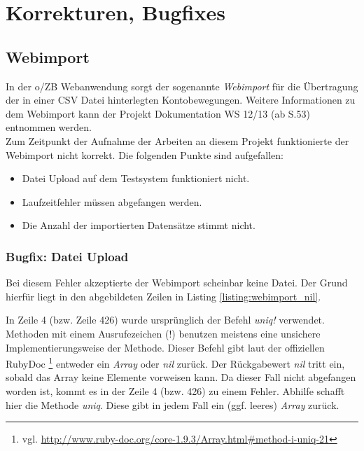 \documentclass[12pt,             %
               a4paper,          %
               listof=totoc,     %
               index=totoc,      %
               bibliography=totoc,%
               oneside,         %
               BCOR1cm,          %
               english   %
               ]{scrbook}
\begin{document}


\clearpage
\chapter{Korrekturen, Bugfixes}
\section{Webimport}
In der o/ZB Webanwendung sorgt der sogenannte \textit{Webimport} für die Übertragung der in einer CSV Datei hinterlegten Kontobewegungen. Weitere Informationen zu dem Webimport kann der Projekt Dokumentation WS 12/13 (ab S.53) entnommen werden.\\

Zum Zeitpunkt der Aufnahme der Arbeiten an diesem Projekt funktionierte der Webimport nicht korrekt. Die folgenden Punkte sind aufgefallen:

\begin{itemize}
     \item{Datei Upload auf dem Testsystem funktioniert nicht.}
     \item{Laufzeitfehler müssen abgefangen werden.}
     \item{Die Anzahl der importierten Datensätze stimmt nicht.} 
\end{itemize}

\subsection{Bugfix: Datei Upload}
Bei diesem Fehler akzeptierte der Webimport scheinbar keine Datei. Der Grund hierfür liegt in den abgebildeten Zeilen in Listing \vref{listing:webimport_nil}.\\

\label{listing:webimport_nil}

In Zeile 4 (bzw. Zeile 426) wurde ursprünglich der Befehl \textit{uniq!} verwendet. Methoden mit einem Ausrufezeichen (!) benutzen meistens eine unsichere Implementierungsweise der Methode. Dieser Befehl gibt laut der offiziellen RubyDoc \footnote{vgl. \url{http://www.ruby-doc.org/core-1.9.3/Array.html\#method-i-uniq-21}} entweder ein \textit{Array} oder \textit{nil} zurück. Der Rückgabewert \textit{nil} tritt ein, sobald das Array keine Elemente vorweisen kann. Da dieser Fall nicht abgefangen worden ist, kommt es in der Zeile 4 (bzw. 426) zu einem Fehler. Abhilfe schafft hier die Methode \textit{uniq}. Diese gibt in jedem Fall ein (ggf. leeres) \textit{Array} zurück. 
\end{document}
